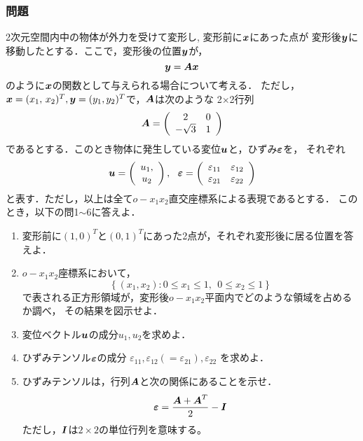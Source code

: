 \documentclass[10pt,a4j]{jarticle}
\begin{document}
\subsubsection*{問題}
2次元空間内中の物体が外力を受けて変形し, 変形前に$\mbox{\boldmath $x$}$にあった点が
変形後$\mbox{\boldmath $y$}$に移動したとする．ここで，変形後の位置$\mbox{\boldmath $y$}$が，
\begin{equation}
	\mbox{\boldmath $y$}=\mbox{\boldmath $A$}\mbox{\boldmath $x$}
	\label{eqn:disp_fld}
\end{equation}
のように$\mbox{\boldmath $x$}$の関数として与えられる場合について考える．
ただし，$\mbox{\boldmath $x$}=(x_1,\, x_2)^T, \mbox{\boldmath $y$}=(y_1, y_2)^T$で，$\mbox{\boldmath $A$}$は次のような
2$\times$2行列
\begin{equation}
	\mbox{\boldmath $A$}=
	\left(
	\begin{array}{cc}
		 2 & 0 \\
	 -\sqrt{3} & 1 
	\end{array}
	\label{eqn:Amat}
	\right)
\end{equation}
であるとする．このとき物体に発生している変位$\mbox{\boldmath $u$}$と，ひずみ$\mbox{\boldmath $\varepsilon$}$を，
それぞれ
\begin{equation}
	\fat{u}=\left( 
	\begin{array}{c}
	u_1,\\
	u_2 
	\end{array}
	\right)
	, \ \ 
	\fat{\varepsilon}
	=
	\left(
	\begin{array}{cc}
		\varepsilon_{11} & \varepsilon_{12} \\
		\varepsilon_{21} & \varepsilon_{22} 
	\end{array}
	\right)
\end{equation}
と表す．ただし，以上は全て$o-x_1x_2$直交座標系による表現であるとする．
このとき，以下の問1$\sim$6に答えよ．
\begin{enumerate}
\item
	変形前に$(1,0)^T$と$(0,1)^T$にあった2点が，それぞれ変形後に居る位置を答えよ．
\item
	$o-x_1x_2$座標系において，
	\[
		\left\{ (x_1,x_2):
		0\leq x_1 \leq 1, 
		\ \
		0\leq x_2 \leq 1
		\right\}
	\]
	で表される正方形領域が，変形後$o-x_1x_2$平面内でどのような領域を占めるか調べ，
	その結果を図示せよ．
\item
	変位ベクトル$\mbox{\boldmath $u$}$の成分$u_1,u_2$を求めよ．
\item
	ひずみテンソル$\mbox{\boldmath $\varepsilon$}$の成分
	$\varepsilon_{11},\varepsilon_{12}(=\varepsilon_{21}), \varepsilon_{22}$
	を求めよ．
\item
	ひずみテンソルは，行列$\mbox{\boldmath $A$}$と次の関係にあることを示せ．
	\[
		\mbox{\boldmath $\varepsilon$}=\frac{\mbox{\boldmath $A$}+\mbox{\boldmath $A$}^T}{2}-\mbox{\boldmath $I$}
	\]
	ただし，$\mbox{\boldmath $I$}$は$2\times 2$の単位行列を意味する。
\end{enumerate}
\end{document}
